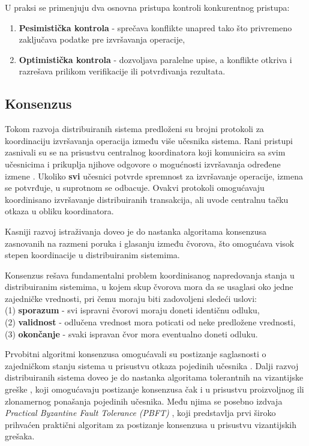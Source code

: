 U praksi se primenjuju dva osnovna pristupa kontroli konkurentnog pristupa:
\begin{enumerate}
\item \textbf{Pesimistička kontrola} - sprečava konflikte unapred tako što privremeno zaključava podatke pre izvršavanja operacije,
\item \textbf{Optimistička kontrola} - dozvoljava paralelne upise, a konflikte otkriva i razrešava prilikom verifikacije ili potvrđivanja rezultata.
\end{enumerate}

\subsection{Konsenzus}
Tokom razvoja distribuiranih sistema predloženi su brojni protokoli za koordinaciju izvršavanja operacija između više učesnika sistema. Rani pristupi zasnivali su se na prisustvu centralnog koordinatora koji komunicira sa svim učesnicima i prikuplja njihove odgovore o mogućnosti izvršavanja određene izmene \cite{graz1978notes}. Ukoliko \textbf{svi} učesnici potvrde spremnost za izvršavanje operacije, izmena se potvrđuje, u suprotnom se odbacuje. Ovakvi protokoli omogućavaju koordinisano izvršavanje distribuiranih transakcija, ali uvode centralnu tačku otkaza u obliku koordinatora.

Kasniji razvoj istraživanja doveo je do nastanka algoritama konsenzusa \cite{nguyen2002consensus} zasnovanih na razmeni poruka i glasanju između čvorova, što omogućava visok stepen koordinacije u distribuiranim sistemima.

\begin{definicija}
Konsenzus rešava fundamentalni problem koordinisanog napredovanja stanja u distribuiranim sistemima, u kojem skup čvorova mora da se usaglasi oko jedne zajedničke vrednosti, pri čemu moraju biti zadovoljeni sledeći uslovi:\\
(1) \textbf{sporazum}  - svi ispravni čvorovi moraju doneti identičnu odluku,\\
(2) \textbf{validnost}  - odlučena vrednost mora poticati od neke predložene vrednosti,\\
(3) \textbf{okončanje}  - svaki ispravan čvor mora eventualno doneti odluku.
\end{definicija}

Prvobitni algoritmi konsenzusa omogućavali su postizanje saglasnosti o zajedničkom stanju sistema u prisustvu otkaza pojedinih učesnika  \cite{lamport2019part}. Dalji razvoj distribuiranih sistema doveo je do nastanka algoritama tolerantnih na vizantijske greške , koji omogućavaju postizanje konsenzusa čak i u prisustvu proizvoljnog ili zlonamernog ponašanja pojedinih učesnika. Među njima se posebno izdvaja \textit{Practical Byzantine Fault Tolerance (PBFT)} \cite{castro1999practical}, koji predstavlja prvi široko prihvaćen praktični algoritam za postizanje konsenzusa u prisustvu vizantijskih grešaka.

